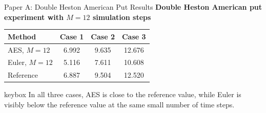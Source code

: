 \begin{frame}{Paper A: Double Heston American Put Results}
  \centering
  \vspace{0.2em}
  {\small\bfseries Double Heston American put experiment with \(M=12\) simulation steps}\\[0.6em]
  \begin{tabular}{lccc}
    \toprule
    Method & Case 1 & Case 2 & Case 3 \\
    \midrule
    AES, \(M=12\) & 6.992 & 9.635 & 12.676 \\
    Euler, \(M=12\) & 5.116 & 7.611 & 10.608 \\
    Reference & 6.887 & 9.504 & 12.520 \\
    \bottomrule
  \end{tabular}

  \vspace{1.0em}
  \begin{beamercolorbox}[rounded=true,sep=0.9ex,wd=0.82\linewidth]{keybox}
    \small In all three cases, AES is close to the reference value, while Euler is visibly below the reference value at the same small number of time steps.
  \end{beamercolorbox}
\end{frame}

